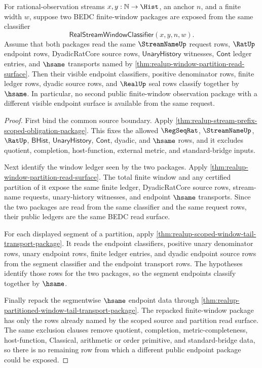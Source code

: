 \begin{theorem}
\label{thm:realup-finite-window-observation-determinacy}
For rational-observation streams $x,y:\mathbb{N}\to\Hist$, an anchor $n$, and
a finite width $w$, suppose two BEDC finite-window packages are exposed from the
same classifier
$$
\mathsf{RealStreamWindowClassifier}(x,y,n,w).
$$
Assume that both packages read the same $\StreamNameUp$ request rows, $\RatUp$
endpoint rows, DyadicRatCore source rows, $\mathsf{UnaryHistory}$ witnesses,
$\mathsf{Cont}$ ledger entries, and $\hsame$ transports named by
\autoref{thm:realup-window-partition-read-surface}. Then their visible endpoint
classifiers, positive denominator rows, finite ledger rows, dyadic source rows,
and $\RealUp$ seal rows classify together by $\hsame$. In particular, no second
public finite-window observation package with a different visible endpoint
surface is available from the same request.
\end{theorem}
\begin{proof}
First bind the common source boundary. Apply
\autoref{thm:realup-stream-prefix-scoped-obligation-package}. This fixes the
allowed $\RegSeqRat$, $\StreamNameUp$, $\RatUp$, $\mathsf{BHist}$,
$\mathsf{UnaryHistory}$, $\mathsf{Cont}$, dyadic, and $\hsame$ rows, and it
excludes quotient, completion, host-function, external metric, and
standard-bridge inputs.

Next identify the window ledger seen by the two packages. Apply
\autoref{thm:realup-window-partition-read-surface}. The total finite window and
any certified partition of it expose the same finite ledger, DyadicRatCore
source rows, stream-name requests, unary-history witnesses, and endpoint
$\hsame$ transports. Since the two packages are read from the same classifier
and the same request rows, their public ledgers are the same BEDC read surface.

For each displayed segment of a partition, apply
\autoref{thm:realup-scoped-window-tail-transport-package}. It reads the endpoint
classifiers, positive unary denominator rows, unary endpoint rows, finite
ledger entries, and dyadic endpoint source rows from the segment classifier and
the endpoint transport rows. The hypotheses identify those rows for the two
packages, so the segment endpoints classify together by $\hsame$.

Finally repack the segmentwise $\hsame$ endpoint data through
\autoref{thm:realup-partitioned-window-tail-transport-package}. The repacked
finite-window package has only the rows already named by the scoped source and
partition read surface. The same exclusion clauses remove quotient,
completion, metric-completeness, host-function, Classical, arithmetic or order
primitive, and standard-bridge data, so there is no remaining row from which a
different public endpoint package could be exposed.
\end{proof}


